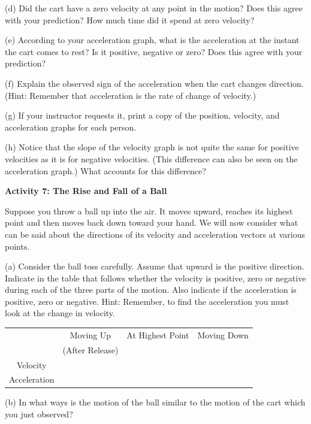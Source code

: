 \pagebreak[2]
(d) Did the cart have a zero velocity at any point in the motion? Does this agree with your prediction? How much time did it spend at zero velocity?
\answerspace{20mm}

(e) According to your acceleration graph, what is the acceleration at the instant
the cart comes to rest? Is it positive, negative or zero? Does this agree with
your prediction? 
\answerspace{20mm}

(f) Explain the observed sign of the acceleration when the cart changes direction. (Hint: Remember that acceleration is the rate of change of velocity.) 
\answerspace{20mm}

(g) If your instructor requests it, print a copy of the position, velocity, and acceleration graphs for each person.

(h) Notice that the slope of the velocity graph is not quite the same for positive velocities as it is for negative velocities. (This difference can also be seen on the acceleration graph.) What accounts for this difference?
\answerspace{20mm}

\textbf{Activity 7: The Rise and Fall of a Ball} 

Suppose you throw a ball up into the air. It moves upward, reaches its highest
point and then moves back down toward your hand. We will now consider what can be said about the directions of its velocity and acceleration vectors at various points.

(a) Consider the ball toss carefully. Assume that upward is the positive direction.
Indicate in the table that follows whether the velocity is positive, zero or
negative during each of the three parts of the motion. Also indicate if the
acceleration is positive, zero or negative. Hint: Remember, to find the acceleration
you must look at the change in velocity.

\vspace{0.3cm}
{\centering \begin{tabular}{|c|c|c|c|}
\hline 
&
Moving Up&
At Highest Point&
Moving Down\\
&
(After Release)&
&
\\
\hline 
Velocity&
&
&
\\
\hline 
Acceleration&
&
&
\\
\hline 
\end{tabular}\par}
\vspace{0.3cm}

(b) In what ways is the motion of the ball similar to the motion of the cart
which you just observed?
\answerspace{10mm}

